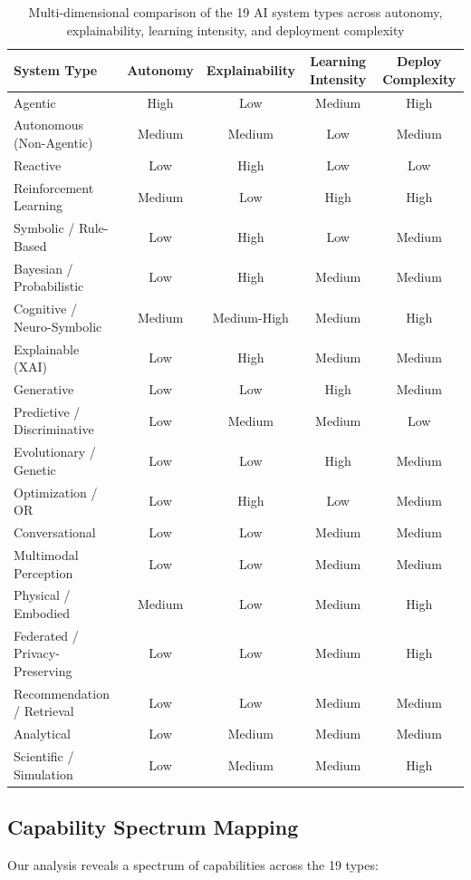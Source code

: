 \documentclass[12pt, a4paper]{article}
\begin{document}
\begin{table}[ht]
  \caption{Multi-dimensional comparison of the 19 AI system types across autonomy, explainability, learning intensity, and deployment complexity}
  \label{tab:comparison}
  \small
  \begin{tabular}{lcccc}
    \toprule
    \textbf{System Type} & \textbf{Autonomy} & \textbf{Explainability} & \textbf{Learning Intensity} & \textbf{Deploy Complexity} \\
    \midrule
    Agentic & High & Low & Medium & High \\
    Autonomous (Non-Agentic) & Medium & Medium & Low & Medium \\
    Reactive & Low & High & Low & Low \\
    Reinforcement Learning & Medium & Low & High & High \\
    Symbolic / Rule-Based & Low & High & Low & Medium \\
    Bayesian / Probabilistic & Low & High & Medium & Medium \\
    Cognitive / Neuro-Symbolic & Medium & Medium-High & Medium & High \\
    Explainable (XAI) & Low & High & Medium & Medium \\
    Generative & Low & Low & High & Medium \\
    Predictive / Discriminative & Low & Medium & Medium & Low \\
    Evolutionary / Genetic & Low & Low & High & Medium \\
    Optimization / OR & Low & High & Low & Medium \\
    Conversational & Low & Low & Medium & Medium \\
    Multimodal Perception & Low & Low & Medium & Medium \\
    Physical / Embodied & Medium & Low & Medium & High \\
    Federated / Privacy-Preserving & Low & Low & Medium & High \\
    Recommendation / Retrieval & Low & Low & Medium & Medium \\
    Analytical & Low & Medium & Medium & Medium \\
    Scientific / Simulation & Low & Medium & Medium & High \\
    \bottomrule
  \end{tabular}
\end{table}

\subsection{Capability Spectrum Mapping}
Our analysis reveals a spectrum of capabilities across the 19 types:
\end{document}
